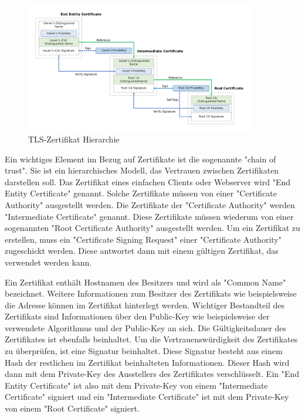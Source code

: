 \begin{figure}[H]
    \centering
    \includegraphics[width=0.9\textwidth]{media/OpenSSL/cert.png}
    \caption{TLS-Zertifikat Hierarchie \cite{ChainOfTrust}}
\end{figure}

Ein wichtiges Element im Bezug auf Zertifikate ist die sogenannte "chain of trust". Sie ist ein hierarchisches Modell, das Vertrauen zwischen Zertifikaten darstellen soll. Das Zertifikat eines einfachen Clients oder Webserver wird "End Entity Certificate" genannt. Solche Zertifikate müssen von einer "Certificate Authority" ausgestellt werden. Die Zertifikate der "Certificate Authority" werden "Intermediate Certificate" genannt. Diese Zertifikate müssen wiederum von einer sogenannten "Root Certificate Authority" ausgestellt werden. Um ein Zertifikat zu erstellen, muss ein "Certificate Signing Request" einer "Certificate Authority" zugeschickt werden. Diese antwortet dann mit einem gültigen Zertifikat, das verwendet werden kann.

Ein Zertifikat enthält Hostnamen des Besitzers und wird als "Common Name" bezeichnet. Weitere Informationen zum Besitzer des Zertifikats wie beispielsweise die Adresse können im Zertifikat hinterlegt werden. Wichtiger Bestandteil des Zertifikats sind Informationen über den Public-Key wie beispielsweise der verwendete Algorithmus und der Public-Key an sich. Die Gültigkeitsdauer des Zertifikates ist ebenfalls beinhaltet. Um die Vertrauenswürdigkeit des Zertifikates zu überprüfen, ist eine Signatur beinhaltet. Diese Signatur besteht aus einem Hash der restlichen im Zertifikat beinhalteten Informationen. Dieser Hash wird dann mit dem Private-Key des Ausstellers des Zertifikates verschlüsselt. Ein "End Entity Certificate" ist also mit dem Private-Key von einem "Intermediate Certificate" signiert und ein "Intermediate Certificate" ist mit dem Private-Key von einem "Root Certificate" signiert. \cite{ChainOfTrust}

